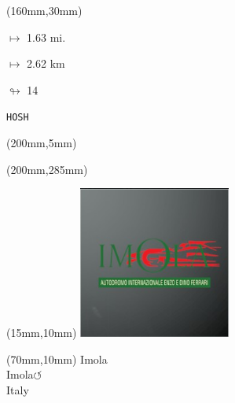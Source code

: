 \begin{textblock*}{40mm}(160mm,30mm)%
\Large
\par$\mapsto$ 1.63 mi.
\par$\mapsto$ 2.62 km
\par$\looparrowright$ 14
\par\hfill\tiny\tt HOSH\\
\end{textblock*}
\begin{textblock*}{20mm}(200mm,5mm)%
\fbox{\thepage}
\label{HOSH}
\end{textblock*}
\begin{textblock*}{20mm}(200mm,285mm)%
\fbox{\thepage}
\end{textblock*}

\null\newpage
\begin{textblock*}{50mm}(15mm,10mm)%
\includegraphics[width=50mm]{LG/2015-05-20_00083.png}
\end{textblock*}
\begin{textblock*}{130mm}(70mm,10mm)%
{\fontsize{20}{20}\selectfont Imola\\}
{\fontsize{16}{16}\selectfont Imola\hfill \huge$\circlearrowleft$\\}
{\fontsize{12}{12}\selectfont Italy\\}
\end{textblock*}
